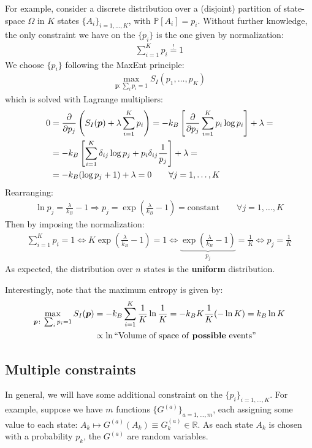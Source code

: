 \documentclass[../template.tex]{subfiles}
\begin{document}
For example, consider a discrete distribution over a (disjoint) partition of state-space $\Omega$ in $K$ states $\{A_i\}_{i=1,\dots,K}$, with $\mathbb{P}[A_i] = p_i$. Without further knowledge, the only constraint we have on the $\{p_i\}$ is the one given by normalization:
\begin{align*}
    \sum_{i=1}^K p_i \overset{!}{=}  1
\end{align*}
We choose $\{p_i\}$ following the MaxEnt principle:
\begin{align*}
    \max_{\bm{p} \colon \sum_i p_i = 1} S_I(p_1, \dots, p_K)
\end{align*}
which is solved with Lagrange multipliers:
\begin{align*}
    0 &= \pdv{p_j} \left(S_I(\bm{p}) + \lambda \sum_{i=1}^K p_i\right) = -k_B \left[\pdv{p_j} \sum_{i=1}^K p_i \log p_i \right] + \lambda=\\
    &= -k_B \left[\sum_{i=1}^K \delta_{ij} \log p_j + p_i \delta_{ij} \frac{1}{p_j} \right] + \lambda =\\
    &= -k_B(\log p_j + 1) + \lambda = 0 \qquad \forall j=1,\dots,K
\end{align*}
Rearranging:
\begin{align*}
    \ln p_j = \frac{\lambda}{k_B} - 1 \Rightarrow p_j = \exp\left(\frac{\lambda}{k_B} -1 \right)  = \text{constant}  \qquad \forall j=1,\dots,K
\end{align*}
Then by imposing the normalization:
\begin{align*}
    \sum_{i=1}^K p_i = 1 \Leftrightarrow 
    K \exp\left(\frac{\lambda}{k_B} - 1 \right) = 1 \Leftrightarrow \underbrace{\exp\left(\frac{\lambda}{k_B} - 1 \right) }_{p_j} = \frac{1}{K} \Leftrightarrow p_j = \frac{1}{K}  
\end{align*}
As expected, the  distribution over $n$ states is the \textbf{uniform} distribution. 

\medskip

Interestingly, note that the maximum entropy is given by:
\begin{align*}
    \max_{\bm{p} \colon \sum_i p_i = 1} S_I(\bm{p}) &= -k_B \sum_{i=1}^K \frac{1}{K} \ln \frac{1}{K} = -k_B K \frac{1}{K} (-\ln K) = k_B \ln K \\
    &\propto \ln \text{``Volume of space of \textbf{possible} events''}
\end{align*}

\subsection{Multiple constraints}
In general, we will have some additional constraint on the $\{p_i\}_{i=1,\dots,K}$. For example, suppose we have $m$ functions $\{G^{(a)}\}_{a=1,\dots,m}$, each assigning some value to each state: $A_k \mapsto G^{(a)}(A_k) \equiv G_k^{(a)} \in \mathbb{R}$. As each state $A_k$ is chosen with a probability $p_k$, the $G^{(a)}$ are random variables.
\end{document}
